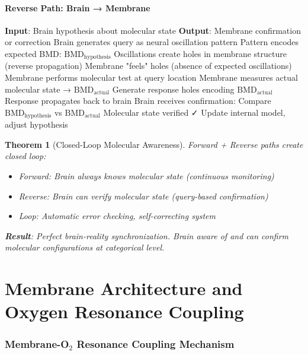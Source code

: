 \documentclass[11pt,a4paper]{article}
\newtheorem{theorem}{Theorem}[section]
\theoremstyle{definition}
\theoremstyle{remark}
\begin{document}
\subsection{Reverse Path: Brain → Membrane}

\begin{algorithm}[H]
\caption{Reverse Molecular Query}
\begin{algorithmic}[1]
\STATE \textbf{Input}: Brain hypothesis about molecular state
\STATE \textbf{Output}: Membrane confirmation or correction
\STATE Brain generates query as neural oscillation pattern
\STATE Pattern encodes expected BMD: $\text{BMD}_{\text{hypothesis}}$
\STATE Oscillations create holes in membrane structure (reverse propagation)
\STATE Membrane "feels" holes (absence of expected oscillations)
\STATE Membrane performs molecular test at query location
\STATE Membrane measures actual molecular state → $\text{BMD}_{\text{actual}}$
\STATE Generate response holes encoding $\text{BMD}_{\text{actual}}$
\STATE Response propagates back to brain
\STATE Brain receives confirmation: Compare $\text{BMD}_{\text{hypothesis}}$ vs $\text{BMD}_{\text{actual}}$
    \STATE Molecular state verified ✓
\ELSE
    \STATE Update internal model, adjust hypothesis
\ENDIF
\end{algorithmic}
\end{algorithm}

\begin{theorem}[Closed-Loop Molecular Awareness]
Forward + Reverse paths create closed loop:
\begin{itemize}
\item Forward: Brain always knows molecular state (continuous monitoring)
\item Reverse: Brain can verify molecular state (query-based confirmation)
\item Loop: Automatic error checking, self-correcting system
\end{itemize}

\textbf{Result}: Perfect brain-reality synchronization. Brain aware of \textit{and can confirm} molecular configurations at categorical level.
\end{theorem}

\part{Membrane Architecture and Oxygen Resonance Coupling}

\section{Membrane-O$_2$ Resonance Coupling Mechanism}
\end{document}
